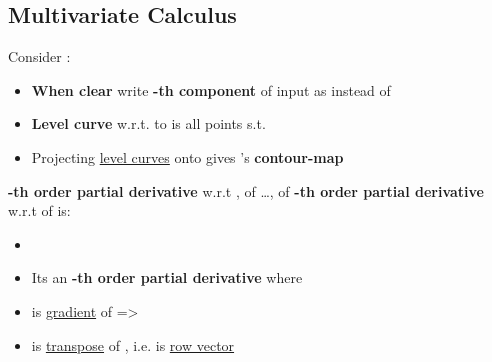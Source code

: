 \subsection*{Multivariate Calculus}


Consider :

\begin{itemize}
      \item \textbf{When clear} write \textbf{-th component} of input as
             instead of 

      \item \textbf{Level curve} w.r.t. to  is all points
            s.t. 

      \item
            Projecting \underline{level curves} onto  gives 's \textbf{contour-map}
\end{itemize}

\hSep %

\textbf{-th order partial derivative} w.r.t
, of \ldots, of \textbf{-th order partial derivative}
w.r.t  of  is:

\begin{itemize}

      \item
      \item
            Its an \textbf{-th order partial derivative} where 

      \item {}
            is \underline{gradient} of \iMbox{f} => 

      \item {} is \underline{transpose} of , i.e.  is \underline{row vector}
\end{itemize}

\hSep %

